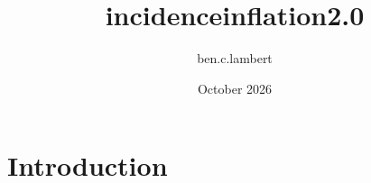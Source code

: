 \documentclass{article}
\title{incidenceinflation2.0}
\author{ben.c.lambert }
\date{October 2026}
\begin{document}
\maketitle

\section{Introduction}
\end{document}
